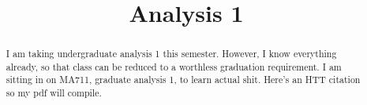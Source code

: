 \documentclass[11pt, letterpaper]{report}
\title{Analysis 1}
\begin{document}
    \maketitle
    \tableofcontents

    \begin{abstract}
	    I am taking undergraduate analysis 1 this semester. However, I know everything already, so that class can be reduced to a worthless graduation requirement. I am sitting in on MA711, graduate analysis 1, to learn actual shit. Here's an HTT citation \cite{htt} so my pdf will compile.
    \end{abstract}

    
    
    

    
    
    
\end{document}
